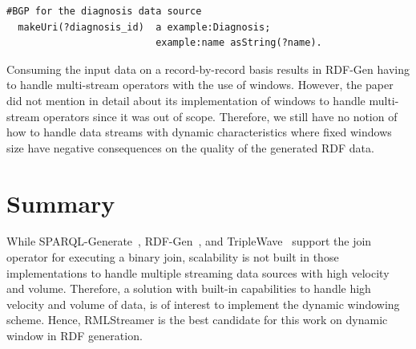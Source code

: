 \begin{lstlisting}[language={SPARQL},
   caption={A simple graph template $G$ with the functions \emph{asString} and \emph{makeUri}.}, 
   label={lst:rdf_gen_example}
  ]
  #BGP for the diagnosis data source
  makeUri(?diagnosis_id)  a example:Diagnosis;
                          example:name asString(?name).
\end{lstlisting}

Consuming the input data on a record-by-record basis results in RDF-Gen having to 
handle multi-stream operators with the use of windows. However, the paper did not 
mention in detail about its implementation of windows to handle 
multi-stream operators since it was out of scope. Therefore, we still have no 
notion of how to handle data streams with dynamic characteristics where fixed windows 
size have negative consequences on the quality of the generated RDF data. 

\section{Summary}
While SPARQL-Generate~\cite{sparql_generate}, RDF-Gen~\cite{rdf_gen}, and TripleWave~\cite{triple_wave} 
support the join operator for executing a binary join, scalability is not built in those implementations
to handle multiple streaming 
data sources with high velocity and volume. 
Therefore, a solution
with built-in capabilities to handle high velocity and volume of data, is of interest
to implement the dynamic windowing scheme. 
Hence, RMLStreamer is the best candidate for this work on dynamic window in RDF generation. 
